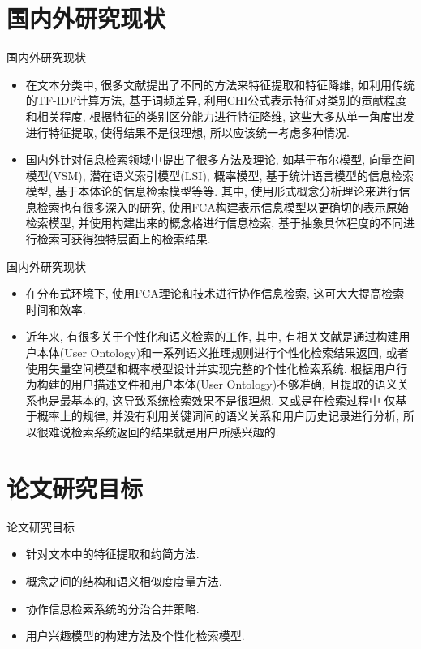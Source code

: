 \documentclass[dvipdfm]{beamer}
\begin{document}
\section{国内外研究现状}
\begin{frame}[t]{国内外研究现状}
  \begin{block}{}
    \begin{itemize}
    \item 在文本分类中, 很多文献提出了不同的方法来特征提取和特征降维, 如利用传统的TF-IDF计算方法, 基于词频差异, 利用CHI公式表示特征对类别的贡献程度和相关程度, 根据特征的类别区分能力进行特征降维, 这些大多从单一角度出发进行特征提取, 使得结果不是很理想, 所以应该统一考虑多种情况. \pause
    \item 国内外针对信息检索领域中提出了很多方法及理论, 如基于布尔模型, 向量空间模型(VSM), 潜在语义索引模型(LSI), 概率模型, 基于统计语言模型的信息检索模型, 基于本体论的信息检索模型等等. 其中, 使用形式概念分析理论来进行信息检索也有很多深入的研究, 使用FCA构建表示信息模型以更确切的表示原始检索模型, 并使用构建出来的概念格进行信息检索, 基于抽象具体程度的不同进行检索可获得独特层面上的检索结果.
    \end{itemize}
  \end{block}
\end{frame}
\begin{frame}[t]{国内外研究现状}
  \begin{block}{}
    \begin{itemize}
    \item 在分布式环境下, 使用FCA理论和技术进行协作信息检索, 这可大大提高检索时间和效率. \pause 
    \item 近年来, 有很多关于个性化和语义检索的工作, 其中, 有相关文献是通过构建用户本体(User Ontology)和一系列语义推理规则进行个性化检索结果返回, 或者使用矢量空间模型和概率模型设计并实现完整的个性化检索系统. 根据用户行为构建的用户描述文件和用户本体(User Ontology)不够准确, 且提取的语义关系也是最基本的, 这导致系统检索效果不是很理想. 又或是在检索过程中 仅基于概率上的规律, 并没有利用关键词间的语义关系和用户历史记录进行分析, 所以很难说检索系统返回的结果就是用户所感兴趣的.
    \end{itemize}
  \end{block}
\end{frame}

\section{论文研究目标}
\begin{frame}[t]{论文研究目标}
  \begin{block}{}
    \begin{itemize}
    \item 针对文本中的\alert{特征提取和约简方法}.\pause
    \item 概念之间的\alert{结构和语义相似度}度量方法.\pause
    \item 协作信息检索系统的分治合并策略.\pause
    \item \alert{用户兴趣模型}的构建方法及\alert{个性化检索模型}. 
    \end{itemize}
  \end{block}
\end{frame}
\end{document}
